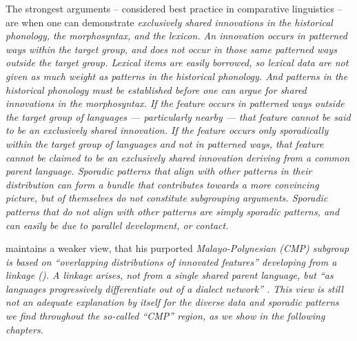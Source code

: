 The strongest arguments -- considered best practice in comparative linguistics -- are
when one can demonstrate \it{exclusively shared innovations} in the historical phonology,
the morphosyntax, and the lexicon.
An innovation occurs in patterned ways within the target group,
and does not occur in those same patterned ways outside the target group.
Lexical items are easily borrowed,
so lexical data are not given as much weight as patterns in the historical phonology.
And patterns in the historical phonology must be established
before one can argue for shared innovations in the morphosyntax.
If the feature occurs in patterned ways outside the target group of languages
--- particularly nearby ---
that feature cannot be said to be an exclusively shared innovation.
If the feature occurs only sporadically within the target group of languages
and not in patterned ways,
that feature cannot be claimed to be an exclusively shared innovation
deriving from a common parent language.
Sporadic patterns that align with other patterns in their distribution
can form a bundle that contributes towards a more convincing picture,
but of themselves do not constitute subgrouping arguments.
Sporadic patterns that do not align with other patterns are simply sporadic patterns,
and can easily be due to parallel development,
or contact.

\citet{Blust1993,Blust2013} maintains a weaker view,
that his purported \it{ Malayo-Polynesian} (CMP) subgroup is based on
“overlapping distributions of innovated features”
developing from a linkage (\citeyear[242]{Blust1993}).
A linkage arises,
not from a single shared parent language,
but “as languages progressively differentiate out of a dialect network” \citep{Ross2017}.
This view is still not an adequate explanation by itself for the diverse data
and sporadic patterns we find throughout the so-called “CMP” region,
as we show in the following chapters.

